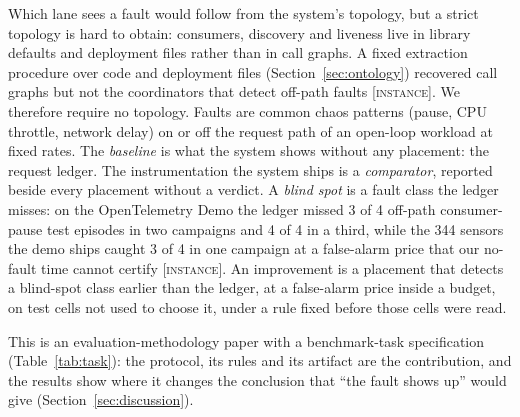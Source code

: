 \documentclass{ceurart}
\newcommand{\scope}[1]{\textsc{[#1]}}
\begin{document}
Which lane sees a fault would follow from the system's topology, but a strict topology is hard to obtain: consumers,
discovery and liveness live in library defaults and deployment files rather than in call graphs. A fixed extraction
procedure over code and deployment files (Section~\ref{sec:ontology}) recovered call graphs but not the coordinators that
detect off-path faults \scope{instance}. We therefore require no topology. Faults are common chaos patterns (pause, CPU
throttle, network delay) on or off the request path of an open-loop workload at fixed rates. The \emph{baseline} is what
the system shows without any placement: the request ledger. The instrumentation the system ships is a \emph{comparator},
reported beside every placement without a verdict. A \emph{blind spot} is a fault class the ledger misses: on the OpenTelemetry Demo the ledger missed 3 of 4 off-path consumer-pause test episodes in
two campaigns and 4 of 4 in a third, while the 344 sensors the demo ships caught 3 of 4 in one campaign at a
false-alarm price that our no-fault time cannot certify \scope{instance}. An improvement is a placement that detects a
blind-spot class earlier than the ledger, at a false-alarm price inside a budget, on test cells not used to choose it,
under a rule fixed before those cells were read.

This is an evaluation-methodology paper with a benchmark-task specification (Table~\ref{tab:task}): the protocol, its
rules and its artifact are the contribution, and the results show where it changes the conclusion that
``the fault shows up'' would give (Section~\ref{sec:discussion}).
\end{document}
